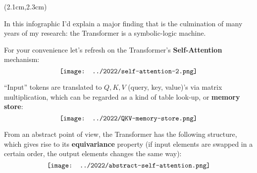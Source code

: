 \begin{preview}

\cc{
\title{\vspace{-1.5cm} \bfseries\color{blue}{\LARGE Transformer 是一种逻辑结构}}
}{
\title{\vspace{-1.5cm} \bfseries\color{blue}{\LARGE Transformer as Logic-Base}}
}

\date{\vspace{-2cm}} %

\maketitle

\setcounter{section}{-1}

\begin{textblock*}{5cm}(2.1cm,2.3cm) %
{}
\end{textblock*}

\begin{minipage}{\textwidth}
\setlength{\parskip}{0.4\baselineskip}

In this infographic I'd explain a major finding that is the culmination of many years of my research: the Transformer is a symbolic-logic machine.

For your convenience let's refresh on the Transformer's \textbf{Self-Attention} mechanism:
\begin{equation}
\vcenter{\hbox{\texttt{[image: ../2022/self-attention-2.png]}}}
\end{equation}

``Input'' tokens are translated to $Q,K,V$ (query, key, value)'s via matrix multiplication, which can be regarded as a kind of table look-up, or \textbf{memory store}:
\begin{equation}
\vcenter{\hbox{\texttt{[image: ../2022/QKV-memory-store.png]}}}
\end{equation}

From an abstract point of view, the Transformer has the following structure, which gives rise to its \textbf{equivariance} property (if input elements are swapped in a certain order, the output elements changes the same way):
\begin{equation}
\vcenter{\hbox{\texttt{[image: ../2022/abstract-self-attention.png]}}}
\end{equation}


\end{minipage}
\end{preview}
